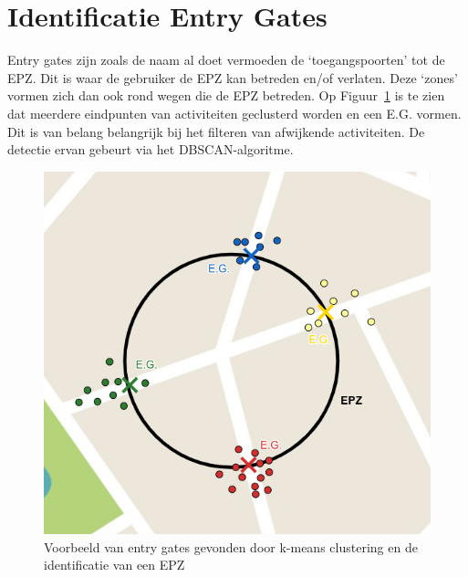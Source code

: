 \section{Identificatie Entry Gates}
Entry gates zijn zoals de naam al doet vermoeden de `toegangspoorten' tot de
\ac{EPZ}. Dit is waar de gebruiker de \ac{EPZ} kan betreden en/of verlaten.
Deze `zones' vormen zich dan ook rond wegen die de \ac{EPZ} betreden. Op
Figuur~\ref{fig:entrygate} is te zien dat meerdere eindpunten van activiteiten
geclusterd worden en een \ac{E.G.} vormen. Dit is van belang belangrijk bij het
filteren van afwijkende activiteiten. De detectie ervan gebeurt via het
\ac{DBSCAN}-algoritme.
\begin{figure}
    \centering
    \includegraphics[width=0.5\linewidth]{fig/EPZ-mechanisme/Entry_Gate.png}
    \caption{Voorbeeld van entry gates gevonden door k-means clustering en de identificatie van een \ac{EPZ}}\label{fig:entrygate}
\end{figure}


